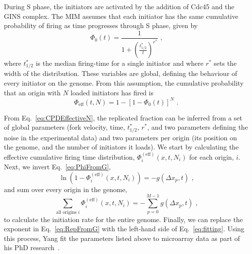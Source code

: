 {		During S phase, the initiators are activated by the addition of Cdc45 and the GINS complex.
		The MIM assumes that each initiator has the same cumulative probability of firing as time progresses through S phase, given by
		\begin{equation}\label{eq:CPDInitiator}
			\Phi_0(t) = \frac{1}{1+\left(\frac{t^*_{1/2}}{t}\right)^{r^*}}\text{ ,}
		\end{equation}
		where $t^*_{1/2}$ is the median firing-time for a single initiator and where $r^*$ sets the width of the distribution.
		These variables are global, defining the behaviour of every initiator on the genome.
		From this assumption, the cumulative probability that an origin with $N$ loaded initiators has fired is
		\begin{equation} \label{eq:CPDEffectiveN}
			\Phi_{\text{eff}}(t,N) = 1 - \left[1 - \Phi_0(t)\right]^N\text{ .}
		\end{equation}
		
		From Eq.~\ref{eq:CPDEffectiveN}, the replicated fraction can be inferred from a set of global parameters (fork velocity, time, $t^*_{1/2}$, $r^*$, and two parameters defining the noise in the experimental data) and two parameters per origin (its position on the genome, and the number of initiators it loads).
		We start by calculating the effective cumulative firing time distribution, $\Phi_{i}^{(\text{eff})}(x,t,N_i)$ for each origin, $i$.
		Next, we invert Eq.~\ref{eq:PhiFromG},
		\begin{equation}
			\ln \left( 1- \Phi_{i}^{(\text{eff})}(x,t,N_i)\right) = - g(\Delta x_p, t) \text{ ,}
		\end{equation}
		and sum over every origin in the genome,
		\begin{equation} \label{eq:fitting}
			\sum\limits_{\text{all origins }i}\Phi_{i}^{(\text{eff})}(x,t,N_i) = - \sum\limits_{p=0}^{M-1} g(\Delta x_p,t) \text{ ,}
		\end{equation}
		to calculate the initiation rate for the entire genome.
		Finally, we can replace the exponent in Eq.~\ref{eq:RepFromG} with the left-hand side of Eq.~\ref{eq:fitting}.
		Using this process, Yang fit the parameters listed above to microarray data as part of his PhD research~\cite{ScottsThesis}.
	
}
